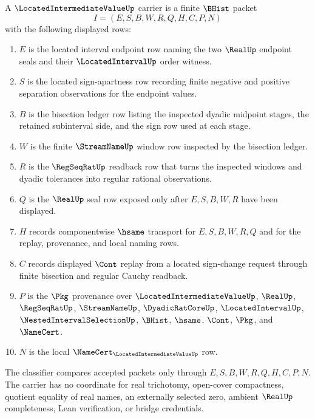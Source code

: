 \begin{definition}
\label{def:located-intermediate-value-carrier}
A $\LocatedIntermediateValueUp$ carrier is a finite $\BHist$ packet
$$
I=(E,S,B,W,R,Q,H,C,P,N)
$$
with the following displayed rows:
\begin{enumerate}
\item $E$ is the located interval endpoint row naming the two $\RealUp$ endpoint seals and their $\LocatedIntervalUp$ order witness.
\item $S$ is the located sign-apartness row recording finite negative and positive separation observations for the endpoint values.
\item $B$ is the bisection ledger row listing the inspected dyadic midpoint stages, the retained subinterval side, and the sign row used at each stage.
\item $W$ is the finite $\StreamNameUp$ window row inspected by the bisection ledger.
\item $R$ is the $\RegSeqRatUp$ readback row that turns the inspected windows and dyadic tolerances into regular rational observations.
\item $Q$ is the $\RealUp$ seal row exposed only after $E,S,B,W,R$ have been displayed.
\item $H$ records componentwise $\hsame$ transport for $E,S,B,W,R,Q$ and for the replay, provenance, and local naming rows.
\item $C$ records displayed $\Cont$ replay from a located sign-change request through finite bisection and regular Cauchy readback.
\item $P$ is the $\Pkg$ provenance over $\LocatedIntermediateValueUp$, $\RealUp$, $\RegSeqRatUp$, $\StreamNameUp$, $\DyadicRatCoreUp$, $\LocatedIntervalUp$, $\NestedIntervalSelectionUp$, $\BHist$, $\hsame$, $\Cont$, $\Pkg$, and $\NameCert$.
\item $N$ is the local $\NameCert_{\LocatedIntermediateValueUp}$ row.
\end{enumerate}
The classifier compares accepted packets only through $E,S,B,W,R,Q,H,C,P,N$. The carrier has no coordinate for real trichotomy, open-cover compactness, quotient equality of real names, an externally selected zero, ambient $\RealUp$ completeness, Lean verification, or bridge credentials.
\end{definition}

